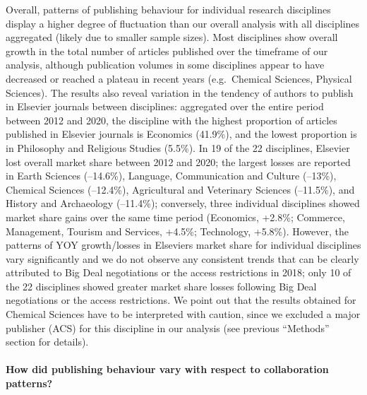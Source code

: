 \documentclass[
]{article}
\begin{document}
Overall, patterns of publishing behaviour for individual research disciplines display a higher degree of fluctuation than our overall analysis with all disciplines aggregated (likely due to smaller sample sizes). Most disciplines show overall growth in the total number of articles published over the timeframe of our analysis, although publication volumes in some disciplines appear to have decreased or reached a plateau in recent years (e.g.~Chemical Sciences, Physical Sciences). The results also reveal variation in the tendency of authors to publish in Elsevier journals between disciplines: aggregated over the entire period between 2012 and 2020, the discipline with the highest proportion of articles published in Elsevier journals is Economics (41.9\%), and the lowest proportion is in Philosophy and Religious Studies (5.5\%). In 19 of the 22 disciplines, Elsevier lost overall market share between 2012 and 2020; the largest losses are reported in Earth Sciences (--14.6\%), Language, Communication and Culture (--13\%), Chemical Sciences (--12.4\%), Agricultural and Veterinary Sciences (--11.5\%), and History and Archaeology (--11.4\%); conversely, three individual disciplines showed market share gains over the same time period (Economics, +2.8\%; Commerce, Management, Tourism and Services, +4.5\%; Technology, +5.8\%). However, the patterns of YOY growth/losses in Elsevier\textquotesingle s market share for individual disciplines vary significantly and we do not observe any consistent trends that can be clearly attributed to Big Deal negotiations or the access restrictions in 2018; only 10 of the 22 disciplines showed greater market share losses following Big Deal negotiations or the access restrictions. We point out that the results obtained for Chemical Sciences have to be interpreted with caution, since we excluded a major publisher (ACS) for this discipline in our analysis (see previous ``Methods'' section for details).

\hypertarget{how-did-publishing-behaviour-vary-with-respect-to-collaboration-patterns}{%
\paragraph{How did publishing behaviour vary with respect to collaboration patterns?}\label{how-did-publishing-behaviour-vary-with-respect-to-collaboration-patterns}}
\end{document}
